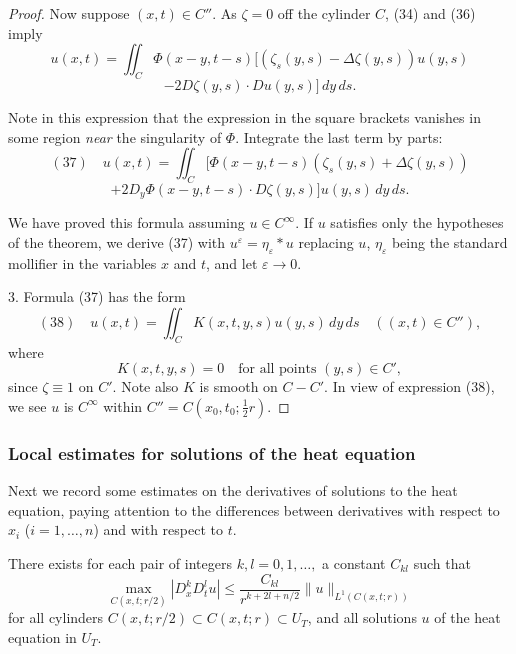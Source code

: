 \begin{proof}
Now suppose $(x,t) \in C''$. As $\zeta = 0$ off the cylinder $C$, (34) and (36) imply
$$u(x,t) = \iint_C \Phi(x-y, t-s)[(\zeta_s(y,s) - \Delta\zeta(y,s))u(y,s)$$
$$- 2D\zeta(y,s) \cdot Du(y,s)] \, dy\,ds.$$

Note in this expression that the expression in the square brackets vanishes in some region \textit{near} the singularity of $\Phi$. Integrate the last term by parts:
$$(37) \quad u(x,t) = \iint_C [\Phi(x-y, t-s)(\zeta_s(y,s) + \Delta \zeta(y,s))$$
$$+ 2D_y\Phi(x-y,t-s) \cdot D\zeta(y,s)]u(y,s)\,dy\,ds.$$

We have proved this formula assuming $u \in C^\infty$. If $u$ satisfies only the hypotheses of the theorem, we derive (37) with $u^\varepsilon = \eta_\varepsilon * u$ replacing $u$, $\eta_\varepsilon$ being the standard mollifier in the variables $x$ and $t$, and let $\varepsilon \to 0$.

3. Formula (37) has the form
$$(38) \quad u(x,t) = \iint_C K(x,t,y,s)u(y,s)\,dy\,ds \quad ((x,t) \in C''),$$
where
$$K(x,t,y,s) = 0 \quad \text{for all points } (y,s) \in C',$$
since $\zeta \equiv 1$ on $C'$. Note also $K$ is smooth on $C - C'$. In view of expression (38), we see $u$ is $C^\infty$ within $C'' = C(x_0, t_0; \frac{1}{2}r)$.
\end{proof}

\subsubsection{Local estimates for solutions of the heat equation}
\label{sec:heat-local-estimates}

Next we record some estimates on the derivatives of solutions to the heat equation, paying attention to the differences between derivatives with respect to $x_i$ ($i = 1, \ldots, n$) and with respect to $t$.

\begin{theorem}
\label{thm:heat-equation-derivative-estimates}
There exists for each pair of integers $k, l = 0, 1, \ldots,$ a constant $C_{kl}$ such that
$$\max_{C(x,t;r/2)} |D_x^k D_t^l u| \leq \frac{C_{kl}}{r^{k+2l+n/2}}\|u\|_{L^1(C(x,t;r))}$$
for all cylinders $C(x,t;r/2) \subset C(x,t;r) \subset U_T$, and all solutions $u$ of the heat equation in $U_T$.
\end{theorem}

